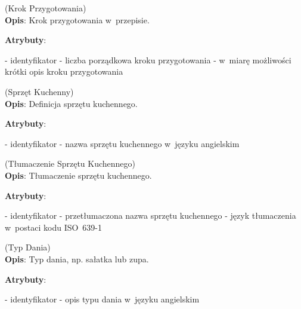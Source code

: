 \begin{enumerate}[label={\textbf{KAT/3/\protect\twodigits{\theenumi}}}, wide, labelwidth=!, labelindent=0pt, labelsep=0pt, series=reqs]
    \label{kat:PreparationStep} (Krok Przygotowania)\\
    \indent\textbf{Opis}: Krok przygotowania w~przepisie.
    \par
    \textbf{Atrybuty}:
    \begin{itemize}[series=atr, wide, align=left, leftmargin=190pt]
        \label{kat:PreparationStep:id}- identyfikator
        \label{kat:PreparationStep:ordinalNumber}- liczba porządkowa kroku przygotowania
        \label{kat:PreparationStep:stepDescription}- w~miarę możliwości krótki opis kroku przygotowania
    \end{itemize}

    \label{kat:KitchenAppliance} (Sprzęt Kuchenny)\\
    \indent\textbf{Opis}: Definicja sprzętu kuchennego.
    \par
    \textbf{Atrybuty}:
    \begin{itemize}[series=atr, wide, align=left, leftmargin=190pt]
        \label{kat:KitchenAppliance:id}- identyfikator
        \label{kat:KitchenAppliance:name}- nazwa sprzętu kuchennego w~języku angielskim
    \end{itemize}

    \label{kat:KitchenApplianceTranslation} (Tłumaczenie Sprzętu Kuchennego)\\
    \indent\textbf{Opis}: Tłumaczenie sprzętu kuchennego.
    \par
    \textbf{Atrybuty}:
    \begin{itemize}[series=atr, wide, align=left, leftmargin=190pt]
        \label{kat:KitchenApplianceTranslation:id}- identyfikator
        \label{kat:KitchenApplianceTranslation:translation}- przetłumaczona nazwa sprzętu kuchennego
        \label{kat:KitchenApplianceTranslation:language}- język tłumaczenia w~postaci kodu ISO~639-1
    \end{itemize}

    \label{kat:DishType} (Typ Dania)\\
    \indent\textbf{Opis}: Typ dania, np. sałatka lub zupa.
    \par
    \textbf{Atrybuty}:
    \begin{itemize}[series=atr, wide, align=left, leftmargin=190pt]
        \label{kat:DishType:id}- identyfikator
        \label{kat:DishType:description}- opis typu dania w~języku angielskim
    \end{itemize}


\end{enumerate}
